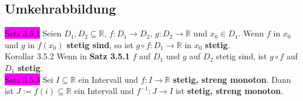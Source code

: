 \documentclass[landscape, 10pt]{article}
\newcommand{\R}{\mathbb{R}}
\begin{document}
\begin{multicols}{3}
       \subsection{Umkehrabbildung}
              \colorbox{magenta}{Satz 3.5.1}
                     Seien \textcolor{NavyBlue}{$D_1,D_2\subseteq\R$, 
                     $f:D_1\longrightarrow D_2,\,g:D_2\longrightarrow\R$} und 
                     \textcolor{NavyBlue}{$x_0\in D_1$}.
                     Wenn \textcolor{NavyBlue}{$f$} in 
                     \textcolor{NavyBlue}{$x_0$} und 
                     \textcolor{NavyBlue}{$g$} in
                     \textcolor{NavyBlue}{$f(x_0)$} 
                     \textbf{stetig sind}, 
                     so ist \textcolor{NavyBlue}{
                     $g\circ f:D_1\longrightarrow\R$} in
                     \textcolor{NavyBlue}{$x_0$} 
                     \textbf{stetig}.\\
              \colorbox{BurntOrange}{Korollar 3.5.2} 
                     Wenn in \textbf{Satz 3.5.1} 
                     \textcolor{NavyBlue}{$f$} auf 
                     \textcolor{NavyBlue}{$D_1$} und 
                     \textcolor{NavyBlue}{$g$} auf \textcolor{NavyBlue}{$D_2$}
                     stetig sind, ist \textcolor{NavyBlue}{$g\circ f$} auf 
                     \textcolor{NavyBlue}{$D_1$}
                     \textbf{stetig}.\\
              \colorbox{magenta}{Satz 3.5.3} 
                     Sei \textcolor{NavyBlue}{$I\subseteq\R$} 
                     ein Intervall und 
                     \textcolor{NavyBlue}{$f:I\longrightarrow\R$} 
                     \textbf{stetig, streng monoton}. Dann ist 
                     \textcolor{NavyBlue}{$J:=f(i)\subseteq\R$} ein Intervall 
                     und \textcolor{NavyBlue}{$f^{-1}:J\longrightarrow I$} 
                     ist \textbf{stetig, streng monoton}.

\end{multicols}
\end{document}
